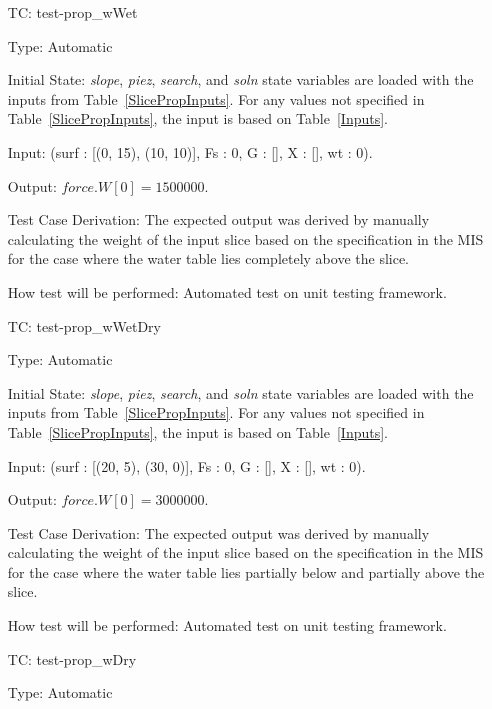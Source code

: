 \documentclass[12pt, titlepage]{article}
\newcounter{utestnum} %
\begin{document}
\begin{enumerate}[label=TC\arabic*:,ref={\arabic*}]
	
	\item [TC\refstepcounter{utestnum}\theutestnum: 
	\label{TC_PropertyWWet}] 
	test-prop\_wWet
	
	Type: Automatic
	
	Initial State: \textit{slope}, \textit{piez}, \textit{search}, and 
	\textit{soln} state variables are loaded with the inputs from 
	Table~\ref{SlicePropInputs}. For any values not specified in 
	Table~\ref{SlicePropInputs}, the input is based on Table~\ref{Inputs}.
	
	Input: (surf : [(0, 15), (10, 10)], Fs : 0, G : [], X : [], wt : 
	0).
	
	Output: $\textit{force.W}[0] = 1500000$.
	
	Test Case Derivation: The expected output was derived by manually 
	calculating the weight of the input slice based on the specification in the 
	MIS for the case where the water table lies completely above the slice.
	
	How test will be performed: Automated test on unit testing framework.
	
	\item [TC\refstepcounter{utestnum}\theutestnum: 
	\label{TC_PropertyWWetDry}] 
	test-prop\_wWetDry
	
	Type: Automatic
	
	Initial State: \textit{slope}, \textit{piez}, \textit{search}, and 
	\textit{soln} state variables are loaded with the inputs from 
	Table~\ref{SlicePropInputs}. For any values not specified in 
	Table~\ref{SlicePropInputs}, the input is based on Table~\ref{Inputs}.
	
	Input: (surf : [(20, 5), (30, 0)], Fs : 0, G : [], X : [], wt : 
	0).
	
	Output: $\textit{force.W}[0] = 3000000$.
	
	Test Case Derivation: The expected output was derived by manually 
	calculating the weight of the input slice based on the specification in the 
	MIS for the case where the water table lies partially below and partially 
	above the slice.
	
	How test will be performed: Automated test on unit testing framework.
	
	\item [TC\refstepcounter{utestnum}\theutestnum: 
	\label{TC_PropertyWDry}] 
	test-prop\_wDry
	
	Type: Automatic
	

\end{enumerate}
\end{document}
